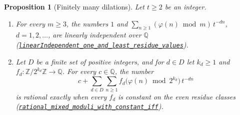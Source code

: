 \documentclass[11pt]{article}
\theoremstyle{plain}
\newtheorem{prop}[thm]{Proposition}
\theoremstyle{definition}
\theoremstyle{remark}
\newcommand{\Z}{\mathbb{Z}}
\newcommand{\Q}{\mathbb{Q}}
\begin{document}
\begin{prop}[Finitely many dilations]
\label{prop:dilations}
Let $t\ge2$ be an integer.
\begin{enumerate}[label=(\alph*),leftmargin=*]
\item For every $m\ge3$, the numbers $1$ and
  $\sum_{n\ge1}(\varphi(n)\bmod m)\,t^{-dn}$, $d=1,2,\ldots$, are linearly
  independent over $\Q$
  (\href{https://github.com/wcook04/plectis-erdos/blob/24edbddbe2bd68e920327a701aad0b9dd0d69675/lean/ErdosProblems/Erdos249/FiniteDilationLinearIndependent.lean\#L42}{\texttt{linearIndependent\_one\_and\_least\_residue\_values}}).
\item Let $D$ be a finite set of positive integers, and for $d\in D$ let
  $k_d\ge1$ and $f_d:\Z/2^{k_d}\Z\to\Q$. For every $c\in\Q$, the number
  \[
   c+\sum_{d\in D}\sum_{n\ge1}f_d\bigl(\varphi(n)\bmod2^{k_d}\bigr)\,t^{-dn}
  \]
  is rational exactly when every $f_d$ is constant on the even residue
  classes
  (\href{https://github.com/wcook04/plectis-erdos/blob/24edbddbe2bd68e920327a701aad0b9dd0d69675/lean/ErdosProblems/Erdos249/FiniteDilationMixedModuli.lean\#L95}{\texttt{rational\_mixed\_moduli\_with\_constant\_iff}}).
\end{enumerate}
\end{prop}
\end{document}
